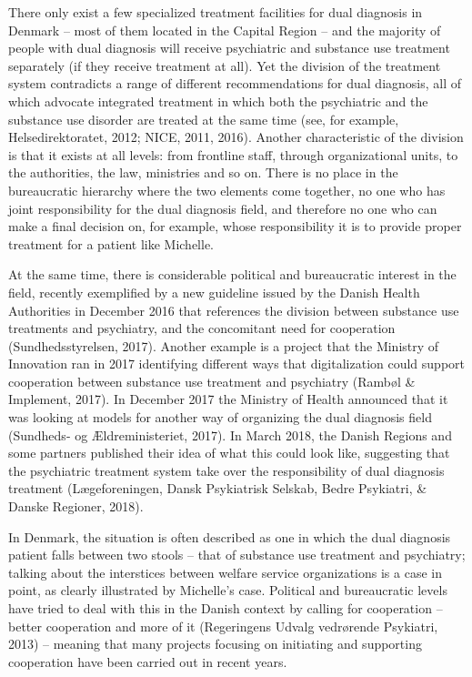 \begin{multicols}{2}
There only exist a few specialized treatment facilities for dual diagnosis in Denmark – most of them located in the Capital Region – and the majority of people with dual diagnosis will receive psychiatric and substance use treatment separately (if they receive treatment at all). Yet the division of the treatment system contradicts a range of different recommendations for dual diagnosis, all of which advocate integrated treatment in which both the psychiatric and the substance use disorder are treated at the same time (see, for example, Helsedirektoratet, 2012; NICE, 2011, 2016). Another characteristic of the division is that it exists at all levels: from frontline staff, through organizational units, to the authorities, the law, ministries and so on. There is no place in the bureaucratic hierarchy where the two elements come together, no one who has joint responsibility for the dual diagnosis field, and therefore no one who can make a final decision on, for example, whose responsibility it is to provide proper treatment for a patient like Michelle.
\par
At the same time, there is considerable political and bureaucratic interest in the field, recently exemplified by a new guideline issued by the Danish Health Authorities in December 2016 that references the division between substance use treatments and psychiatry, and the concomitant need for cooperation (Sundhedsstyrelsen, 2017). Another example is a project that the Ministry of Innovation ran in 2017 identifying different ways that digitalization could support cooperation between substance use treatment and psychiatry (Rambøl \& Implement, 2017). In December 2017 the Ministry of Health announced that it was looking at models for another way of organizing the dual diagnosis field (Sundheds- og Ældreministeriet, 2017). In March 2018, the Danish Regions and some partners published their idea of what this could look like, suggesting that the psychiatric treatment system take over the responsibility of dual diagnosis treatment (Lægeforeningen, Dansk Psykiatrisk Selskab, Bedre Psykiatri, \& Danske Regioner, 2018).
\par
In Denmark, the situation is often described as one in which the dual diagnosis patient falls between two stools – that of substance use treatment and psychiatry; talking about the interstices between welfare service organizations is a case in point, as clearly illustrated by Michelle’s case. Political and bureaucratic levels have tried to deal with this in the Danish context by calling for cooperation – better cooperation and more of it (Regeringens Udvalg vedrørende Psykiatri, 2013) – meaning that many projects focusing on initiating and supporting cooperation have been carried out in recent years.

\end{multicols}
